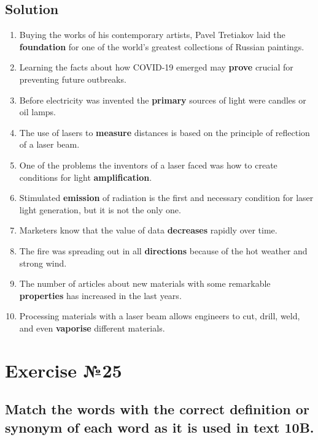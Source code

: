 \subsection*{Solution}
\begin{enumerate}
      \item Buying the works of his contemporary artists, Pavel Tretiakov laid the
            \textbf{foundation} for one of the world’s greatest collections of
            Russian paintings.
      \item Learning the facts about how COVID-19 emerged may \textbf{prove} crucial
            for preventing future outbreaks.
      \item Before electricity was invented the \textbf{primary} sources of light
            were candles or oil lamps.
      \item The use of lasers to \textbf{measure} distances is based on the
            principle of reflection of a laser beam.
      \item One of the problems the inventors of a laser faced was how to create
            conditions for light \textbf{amplification}.
      \item Stimulated \textbf{emission} of radiation is the first and necessary
            condition for laser light generation, but it is not the only one.
      \item Marketers know that the value of data \textbf{decreases} rapidly over
            time.
      \item The fire was spreading out in all \textbf{directions} because of the
            hot weather and strong wind.
      \item The number of articles about new materials with some remarkable
            \textbf{properties} has increased in the last years.
      \item Processing materials with a laser beam allows engineers to cut, drill,
            weld, and even \textbf{vaporise} different materials.
\end{enumerate}

\section{Exercise №25}
\subsection*{Match the words with the correct definition or synonym of each word as it
      is used in text 10B.}

